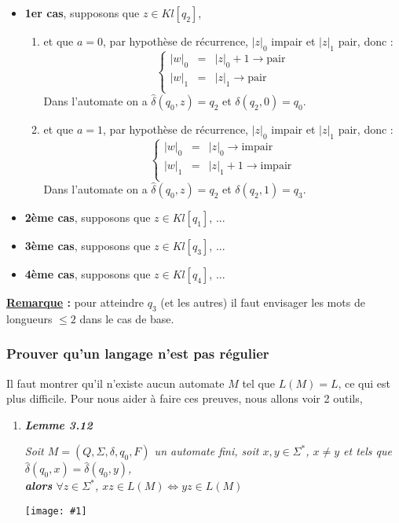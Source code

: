 \documentclass{article}
\newcommand{\titre}[1]{\textcolor{title}{#1}}
\newcommand{\tsssect}[1]{\titre{\subsubsection{#1}}}
\newcommand{\term}[1]{\textit{\textcolor{maintitle}{#1}}}
\newcommand{\imgR}[2]{\begin{center}\texttt{[image: \#1]}\end{center}}
\begin{document}
\begin{sffamily}
\begin{itemize}
	\begin{itemize}
	\item \textbf{1er cas}, supposons que $z \in Kl[q_2]$,
		\begin{enumerate}
		\item et que $a = 0$, par hypothèse de récurrence, $|z|_0$ impair et $|z|_1$ pair, donc :
		$$\left\{\begin{array}{lll}
		|w|_0 & = &|z|_0 + 1 \rightarrow \text{pair} \\	
		|w|_1 & = &|z|_1 \rightarrow \text{pair} \\	
		\end{array}\right.$$
		Dans l'automate on a $\hat{\delta}(q_0,z) = q_2$ et $\delta(q_2,0)=q_0$.
		\item et que $a = 1$, par hypothèse de récurrence, $|z|_0$ impair et $|z|_1$ pair, donc :
		$$\left\{\begin{array}{lll}
		|w|_0 & = &|z|_0 \rightarrow \text{impair} \\	
		|w|_1 & = &|z|_1 + 1 \rightarrow \text{impair} \\	
		\end{array}\right.$$
		Dans l'automate on a $\hat{\delta}(q_0,z) = q_2$ et $\delta(q_2,1)=q_3$.			
		\end{enumerate}
	\item \textbf{2ème cas}, supposons que $z \in Kl[q_1]$, ...
	\item \textbf{3ème cas}, supposons que $z \in Kl[q_3]$, ...
	\item \textbf{4ème cas}, supposons que $z \in Kl[q_4]$, ... \\
	\end{itemize}
\end{itemize}

\noindent \textbf{\underline{Remarque} :} pour atteindre $q_3$ (et les autres) il faut envisager les mots de longueurs 
$\leq 2$ dans le cas de base.

\newpage

\tsssect{Prouver qu'un langage n'est pas régulier}

Il faut montrer qu'il n'existe aucun automate $M$ tel que $L(M) = L$, ce qui est plus difficile. Pour nous aider à
faire ces preuves, nous allons voir 2 outils, \\
\begin{enumerate}
\item \term{\textbf{Lemme 3.12}} \\
\begin{center}
\term{Soit $M = (Q,\Sigma,\delta,q_0,F)$ un automate fini, soit $x,y \in \Sigma^*$, $x \neq y$ et tels que
$\hat{\delta}(q_0,x) = \hat{\delta}(q_0,y)$, \textbf{\\alors} $\forall z \in \Sigma^*$, $xz \in L(M) \Leftrightarrow yz 
\in L(M)$}
\end{center}
\imgR{img12.png}{200}


\end{enumerate}
\end{sffamily}
\end{document}

